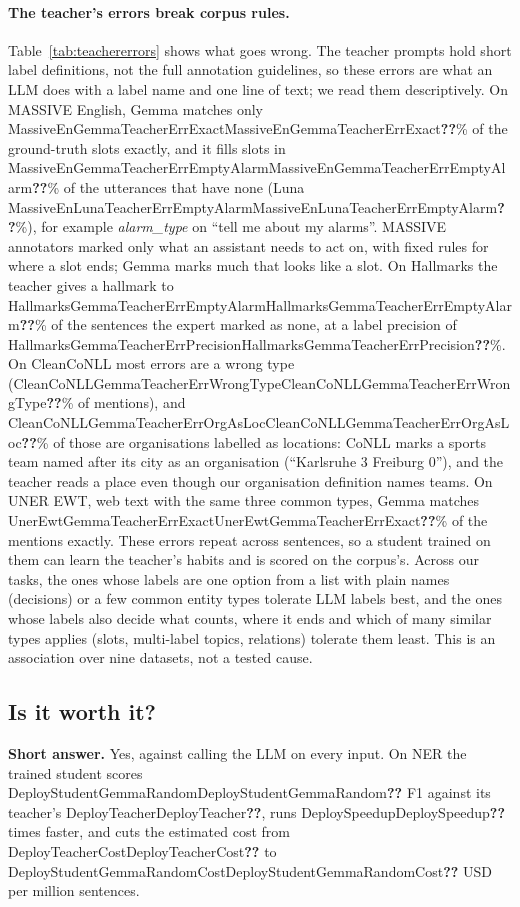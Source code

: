 \documentclass[11pt]{article}
\newcommand{\res}[1]{\ifcsname #1\endcsname\csname #1\endcsname\else\textbf{??}\fi}
\newcommand{\answer}[1]{\noindent\textbf{Short answer.} #1\par\medskip}
\begin{document}
\paragraph{The teacher's errors break corpus rules.} Table~\ref{tab:teachererrors} shows what goes wrong. The teacher prompts hold short label definitions, not the full annotation guidelines, so these errors are what an LLM does with a label name and one line of text; we read them descriptively. On MASSIVE English, Gemma matches only \res{MassiveEnGemmaTeacherErrExact}\% of the ground-truth slots exactly, and it fills slots in \res{MassiveEnGemmaTeacherErrEmptyAlarm}\% of the utterances that have none (Luna \res{MassiveEnLunaTeacherErrEmptyAlarm}\%), for example \emph{alarm\_type} on ``tell me about my alarms''. MASSIVE annotators marked only what an assistant needs to act on, with fixed rules for where a slot ends; Gemma marks much that looks like a slot. On Hallmarks the teacher gives a hallmark to \res{HallmarksGemmaTeacherErrEmptyAlarm}\% of the sentences the expert marked as none, at a label precision of \res{HallmarksGemmaTeacherErrPrecision}\%. On CleanCoNLL most errors are a wrong type (\res{CleanCoNLLGemmaTeacherErrWrongType}\% of mentions), and \res{CleanCoNLLGemmaTeacherErrOrgAsLoc}\% of those are organisations labelled as locations: CoNLL marks a sports team named after its city as an organisation (``Karlsruhe 3 Freiburg 0''), and the teacher reads a place even though our organisation definition names teams. On UNER EWT, web text with the same three common types, Gemma matches \res{UnerEwtGemmaTeacherErrExact}\% of the mentions exactly. These errors repeat across sentences, so a student trained on them can learn the teacher's habits and is scored on the corpus's. Across our tasks, the ones whose labels are one option from a list with plain names (decisions) or a few common entity types tolerate LLM labels best, and the ones whose labels also decide what counts, where it ends and which of many similar types applies (slots, multi-label topics, relations) tolerate them least. This is an association over nine datasets, not a tested cause.

\subsection{Is it worth it?}
\label{sec:worth}

\answer{Yes, against calling the LLM on every input. On NER the trained student scores \res{DeployStudentGemmaRandom} F1 against its teacher's \res{DeployTeacher}, runs \res{DeploySpeedup} times faster, and cuts the estimated cost from \res{DeployTeacherCost} to \res{DeployStudentGemmaRandomCost} USD per million sentences.}
\end{document}
